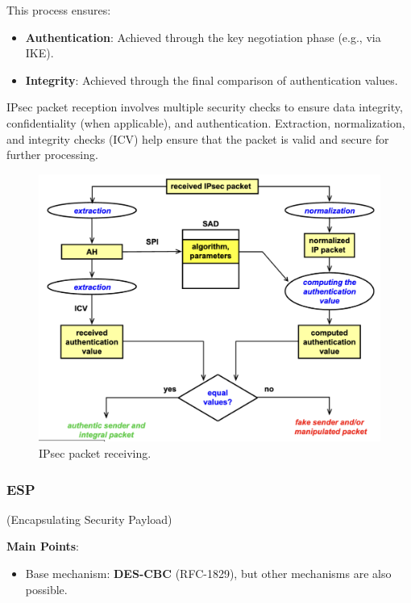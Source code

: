 \begin{tcolorbox}[colback=blue!10!white, colframe=blue!50!white, title=Beware!]
    This process ensures:
    \begin{itemize}
        \item \textbf{Authentication}: Achieved through the key negotiation phase (e.g., via IKE).
        \item \textbf{Integrity}: Achieved through the final comparison of authentication values.
    \end{itemize}
\end{tcolorbox}

\begin{tcolorbox}[colback=lightblue] 
    IPsec packet reception involves multiple security checks to ensure data integrity, confidentiality (when applicable), and authentication. Extraction, normalization, and integrity checks (ICV) help ensure that the packet is valid and secure for further processing.
\end{tcolorbox}

\begin{figure}[H]
  \includegraphics[width=\linewidth]{Images/NetSec/packet_receiving.png}
  \caption{IPsec packet receiving.}
  \label{fig:ipsec_packet_rec}
\end{figure}


\subsubsection{ESP}
\begin{center}
    (Encapsulating Security Payload)
\end{center}
\textbf{Main Points}:
\begin{itemize}
    \item Base mechanism: \textbf{DES-CBC} (RFC-1829), but other mechanisms are also possible.
\end{itemize}

